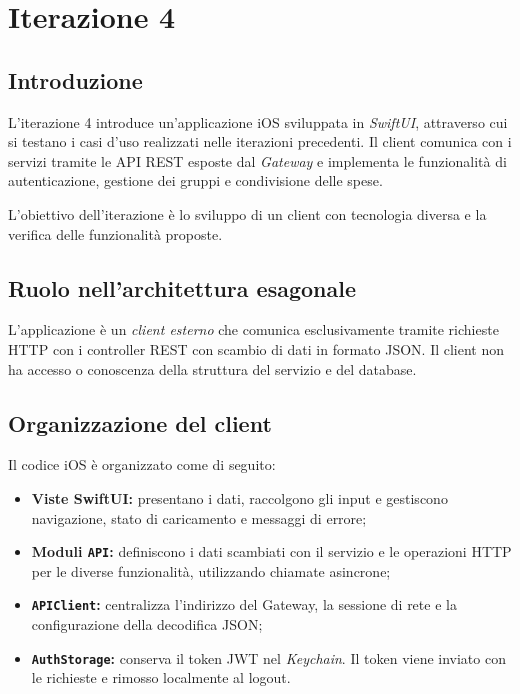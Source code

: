 \section{Iterazione 4}

\subsection{Introduzione}
L'iterazione 4 introduce un'applicazione iOS sviluppata in \emph{SwiftUI}, attraverso cui si testano i casi d'uso realizzati nelle iterazioni precedenti. Il client comunica con i servizi tramite le API REST esposte dal \emph{Gateway} e implementa le funzionalità di autenticazione, gestione dei gruppi e condivisione delle spese.

L'obiettivo dell'iterazione è lo sviluppo di un client con tecnologia diversa e la verifica delle funzionalità proposte.

\subsection{Ruolo nell'architettura esagonale}
L'applicazione è un \emph{client esterno} che comunica esclusivamente tramite richieste HTTP con i controller REST con scambio di dati in formato JSON. Il client non ha accesso o conoscenza della struttura del servizio e del database.

\subsection{Organizzazione del client}
Il codice iOS è organizzato come di seguito:
\begin{itemize}
    \item \textbf{Viste SwiftUI:} presentano i dati, raccolgono gli input e gestiscono navigazione, stato di caricamento e messaggi di errore;
    \item \textbf{Moduli \texttt{API}:} definiscono i dati scambiati con il servizio e le operazioni HTTP per le diverse funzionalità, utilizzando chiamate asincrone;
    \item \textbf{\texttt{APIClient}:} centralizza l'indirizzo del Gateway, la sessione di rete e la configurazione della decodifica JSON;
    \item \textbf{\texttt{AuthStorage}:} conserva il token JWT nel \emph{Keychain}. Il token viene inviato con le richieste e rimosso localmente al logout.
\end{itemize}

